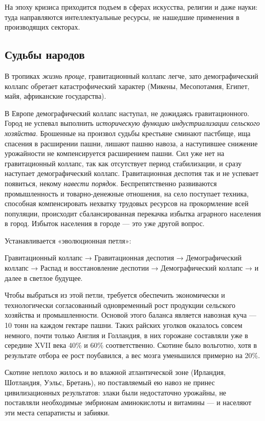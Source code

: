 На эпоху кризиса приходится подъем в сферах искусства, религии и даже науки: туда направляются интеллектуальные ресурсы,
не нашедшие применения в производящих секторах.

\subsection[Судьбы народов]{Судьбы народов}

В тропиках \textit{жизнь проще}, гравитационный коллапс легче, зато демографический коллапс обретает катастрофический
характер (Микены, Месопотамия, Египет, майя, африканские государства).


В Европе демографический коллапс наступал, не дожидаясь гравитационного. Город не успевал выполнить \textit{историческую
функцию} \textit{индустриализации} \textit{сельского хозяйства}. Брошенные на произвол судьбы крестьяне сминают
пастбище, ища спасения в расширении пашни, лишают пашню навоза, а наступившее снижение урожайности не компенсируется
расширением пашни. Сил уже нет на гравитационный коллапс, так как отсутствует период стабилизации, и сразу наступает
демографический коллапс. Гравитационная деспотия так и не успевает появиться, некому \textit{навести порядок}.
Беспрепятственно развиваются промышленность и товарно-денежные отношения, на село поступает техника, способная
компенсировать нехватку трудовых ресурсов на прокормление всей популяции, происходит сбалансированная перекачка избытка
аграрного населения в город. Избыток населения в городе — это уже другой вопрос.


Устанавливается «эволюционная петля»:


Гравитационный коллапс → Гравитационная деспотия → Демографический коллапс → Распад и восстановление деспотии →
Демографический коллапс → и далее в светлое будущее.


Чтобы выбраться из этой петли, требуется обеспечить экономически и технологически согласованный одновременный рост
продукции сельского хозяйства и промышленности. Основой этого баланса является навозная куча — 10 тонн на каждом
гектаре пашни. Таких райских уголков оказалось совсем немного, почти только Англия и Голландия, в них горожане
составляли уже в середине \foreignlanguage{english}{XVII} века 40\% и 60\% соответственно. Скотине было вольготно, хотя
в результате отбора ее рост поубавился, а вес мозга уменьшился примерно на 20\%.


Скотине неплохо жилось и во влажной атлантической зоне (Ирландия, Шотландия, Уэльс, Бретань), но поставляемый ею навоз
не принес цивилизационных результатов: злаки были недостаточно урожайны, не поставляли необходимые эмбрионам
аминокислоты и витамины — и населяют эти места сепаратисты и забияки.

